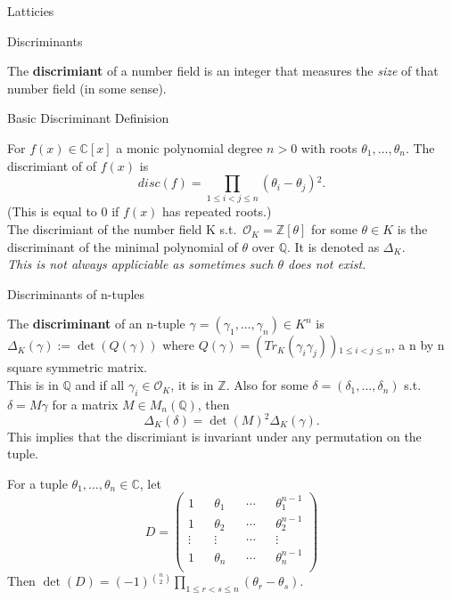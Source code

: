 \documentclass[12pt, letterpaper]{article}
\newcommand{\C}{\mathbb{C}}
\newcommand{\Q}{\mathbb{Q}}
\newcommand{\Z}{\mathbb{Z}}
\newcommand{\Ok}{\mathcal{O}}
\begin{document}
\begin{section}{Latticies}

  \begin{subsection}{Discriminants}

    The \textbf{discrimiant} of a number field is an integer that measures the
    \textit{size} of that number field (in some sense).

    \begin{subsubsection}{Basic Discriminant Definision}

      For \(f(x) \in \C[x]\) a monic polynomial degree \(n > 0\) with roots
      \(\theta_{1}, \dots , \theta_{n}\). The discrimiant of of \(f(x)\) is
      \[disc(f) = \prod_{1 \leq i < j \leq n}
        (\theta_{i} - \theta_{j}){}^{2}.\] (This is equal to 0 if \(f(x)\) has
      repeated  roots.) \\
      The discrimiant of the number field K s.t.\ \(\Ok_{K} = \Z[\theta]\) for
      some \(\theta \in K\) is the discriminant of the minimal polynomial of
      \(\theta\) over \(\Q\). It is denoted as \(\Delta_{K}\). \\
      \textit{This is not always appliciable as sometimes such \(\theta\) does
        not exist.}

    \end{subsubsection}

    \begin{subsubsection}{Discriminants of n-tuples}

      The \textbf{discriminant} of an n-tuple \(\gamma = (\gamma_{1}, \dots ,
      \gamma_{n}) \in K^{n}\) is \(\Delta_{K}(\gamma) := \det(Q(\gamma))\)
      where \(Q(\gamma) = (Tr_{K}(\gamma_{i} \gamma_{j})
      ){}_{1 \leq i < j \leq n}\), a n by n square symmetric matrix. \\
      This is in \(\Q\) and if all \(\gamma_{i} \in \Ok_{K}\), it is in \(\Z\).
      Also for some \(\delta = (\delta_{1}, \dots , \delta_{n})\) s.t.\
      \(\delta = M \gamma\) for a matrix \(M \in M_{n}(\Q)\), then
      \[\Delta_{K}(\delta) = \det(M){}^{2} \Delta_{K}(\gamma).\] This implies
      that the discrimiant is invariant under any permutation on the tuple.


      For a tuple \(\theta_{1}, \dots , \theta_{n} \in \C\), let
      \[ D =
        \begin{pmatrix}
          1 && \theta_{1} && \cdots && \theta^{n - 1}_{1} \\
          1 && \theta_{2} && \cdots && \theta^{n - 1}_{2} \\
          \vdots && \vdots && \cdots && \vdots \\
          1 && \theta_{n} && \cdots && \theta^{n - 1}_{n} \\
        \end{pmatrix}
      \]
      Then \(\det(D) = (-1){}^{{n}\choose{2}} \prod_{1 \leq r < s \leq n}
      (\theta_{r} - \theta_{s})\).


\end{subsubsection}
\end{subsection}
\end{section}
\end{document}
